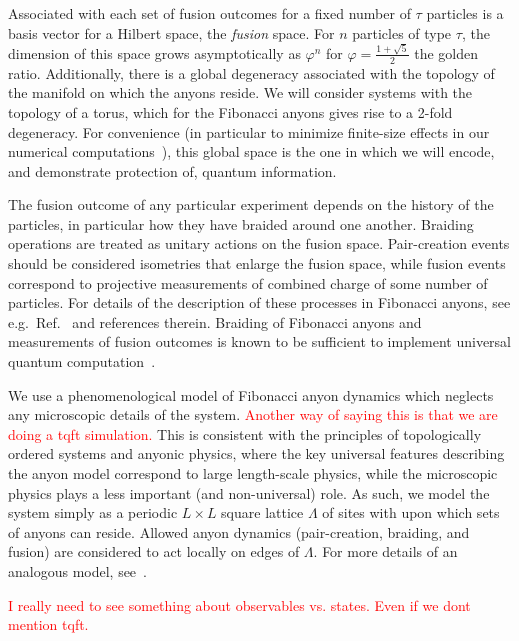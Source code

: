 \documentclass[aps, prl, letterpaper, twocolumn, superscriptaddress, notitlepage, 10pt]{revtex4-1}
\newcommand{\dude}[1]{\textcolor{red}{#1}}
\begin{document}
Associated with each set of fusion outcomes for a fixed number of $\tau$ particles is a basis 
vector for a Hilbert space, the \emph{fusion} space. For $n$ particles of type $\tau$, the 
dimension of this space grows asymptotically as $\varphi^n$ for $\varphi=\frac{1+\sqrt{5}}{2}$ 
the golden ratio. Additionally, there is a global degeneracy associated with the topology of the 
manifold on which the anyons reside. We will consider systems with the topology of a torus, 
which for the Fibonacci anyons gives rise to a 2-fold degeneracy. For convenience 
(in particular to minimize finite-size effects in our numerical computations~\cite{Brell2013}), 
this global space is the one in which we will encode, and demonstrate protection of, quantum 
information.

The fusion outcome of any particular experiment depends on the history of the particles, in 
particular how they have braided around one another. Braiding operations are treated as 
unitary actions on the fusion space. Pair-creation events should be considered isometries 
that enlarge the fusion space, while fusion events correspond to projective measurements 
of combined charge of some number of particles. For details of the description of these 
processes in Fibonacci anyons, see e.g.~Ref.~\cite{Nayak2008} and references therein. 
Braiding of Fibonacci anyons and measurements of fusion outcomes is known to be 
sufficient to implement universal quantum computation~\cite{Freedman2002, Nayak2008}.

We use a phenomenological model of Fibonacci anyon dynamics which neglects any 
microscopic details of the system. 
\dude{Another way of saying this is that we are doing a tqft simulation.}
This is consistent with the principles of topologically 
ordered systems and anyonic physics, where the key universal features describing the 
anyon model correspond to large length-scale physics, while the microscopic physics plays 
a less important (and non-universal) role. As such, we model the system simply as a 
periodic $L\times L$ square lattice $\Lambda$ of sites with upon which sets of anyons can 
reside. Allowed anyon dynamics (pair-creation, braiding, and fusion) are considered to act 
locally on edges of $\Lambda$. For more details of an analogous model, see~\cite{Brell2013}.

\dude{I really need to see something about observables vs. states. Even if
we dont mention tqft.}

\end{document}
